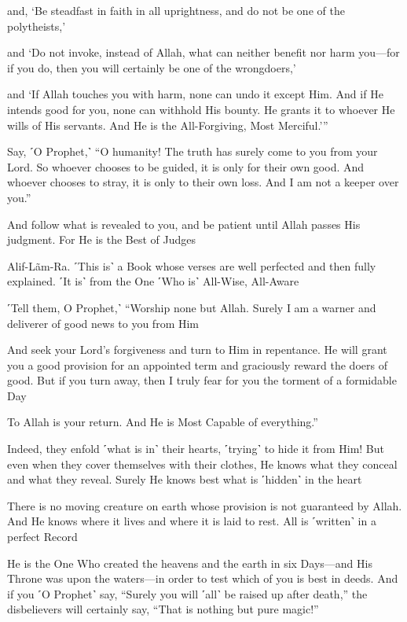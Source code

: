 and, ‘Be steadfast in faith in all uprightness, and do not be one of the polytheists,’

and ‘Do not invoke, instead of Allah, what can neither benefit nor harm you—for if you do, then you will certainly be one of the wrongdoers,’

and ‘If Allah touches you with harm, none can undo it except Him. And if He intends good for you, none can withhold His bounty. He grants it to whoever He wills of His servants. And He is the All-Forgiving, Most Merciful.’”

Say, ˹O Prophet,˺ “O humanity! The truth has surely come to you from your Lord. So whoever chooses to be guided, it is only for their own good. And whoever chooses to stray, it is only to their own loss. And I am not a keeper over you.”

And follow what is revealed to you, and be patient until Allah passes His judgment. For He is the Best of Judges

Alif-Lãm-Ra. ˹This is˺ a Book whose verses are well perfected and then fully explained. ˹It is˺ from the One ˹Who is˺ All-Wise, All-Aware

˹Tell them, O Prophet,˺ “Worship none but Allah. Surely I am a warner and deliverer of good news to you from Him

And seek your Lord’s forgiveness and turn to Him in repentance. He will grant you a good provision for an appointed term and graciously reward the doers of good. But if you turn away, then I truly fear for you the torment of a formidable Day

To Allah is your return. And He is Most Capable of everything.”

Indeed, they enfold ˹what is in˺ their hearts, ˹trying˺ to hide it from Him! But even when they cover themselves with their clothes, He knows what they conceal and what they reveal. Surely He knows best what is ˹hidden˺ in the heart

There is no moving creature on earth whose provision is not guaranteed by Allah. And He knows where it lives and where it is laid to rest. All is ˹written˺ in a perfect Record

He is the One Who created the heavens and the earth in six Days—and His Throne was upon the waters—in order to test which of you is best in deeds. And if you ˹O Prophet˺ say, “Surely you will ˹all˺ be raised up after death,” the disbelievers will certainly say, “That is nothing but pure magic!”


